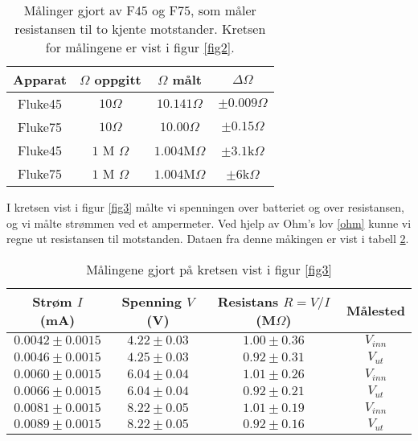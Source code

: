 \documentclass[%
 reprint,
 amsmath,amssymb,
 aps,
]{revtex4-1}
\begin{document}
\begin{table}[h!]
\centering
\caption{Målinger gjort av F$45$ og F$75$, som måler resistansen til to kjente motstander. Kretsen for målingene er vist i figur \ref{fig2}.}
\label{table2}
\begin{tabular}{c c c c}
\toprule
Apparat & $\Omega$ oppgitt & $\Omega$ målt    & $\Delta \Omega$    \\
\hline
Fluke45 & $10\Omega$       & $10.141 \Omega$  & $\pm 0.009\Omega$ \\
Fluke75 & $10\Omega$       & $10.00\Omega$     & $\pm 0.15\Omega$    \\
Fluke45 & $1$ M $\Omega$   & $1.004$M$\Omega$ & $\pm 3.1$k$\Omega$ \\
Fluke75 & $1$ M $\Omega$   & $1.004$M$\Omega$ & $\pm 6$k$\Omega$   \\
\end{tabular}
\end{table}
I kretsen vist i figur \ref{fig3} målte vi spenningen over batteriet og over resistansen, og vi målte strømmen ved et ampermeter. Ved hjelp av Ohm's lov \eqref{ohm} kunne vi regne ut resistansen til motstanden. Dataen fra denne måkingen er vist i tabell \ref{table3}.
\begin{table}[h!]
\centering
\caption{Målingene gjort på kretsen vist i figur \ref{fig3}}
\label{table3}
\begin{tabular}{c c c c }
\toprule
    Strøm $I$ (mA) & Spenning $V$ (V) & Resistans $R = V/I$ (M$\Omega$) & Målested \\
\hline
 $ 0.0042 \pm 0.0015$  &   $4.22 \pm 0.03$ &                $  1.00 \pm 0.36 $ &      $V_{inn}$ \\
 $0.0046 \pm 0.0015$ &   $ 4.25 \pm 0.03$ &             $    0.92 \pm 0.31 $&     $ V_{ut} $\\
 $0.0060 \pm 0.0015$ &   $ 6.04 \pm 0.04$ &                 $ 1.01 \pm 0.26 $&     $ V_{inn}$ \\
 $0.0066 \pm 0.0015 $ &   $ 6.04 \pm 0.04$ &               $   0.92 \pm 0.21 $ &     $ V_{ut}$ \\
 $0.0081 \pm 0.0015$ &   $ 8.22 \pm 0.05$ &                 $ 1.01 \pm 0.19 $&     $ V_{inn}$ \\
$ 0.0089 \pm 0.0015$ &    $8.22 \pm 0.05$ &                  $0.92 \pm 0.16$ &      $V_{ut}$ \\
\end{tabular}
\end{table}
\end{document}
